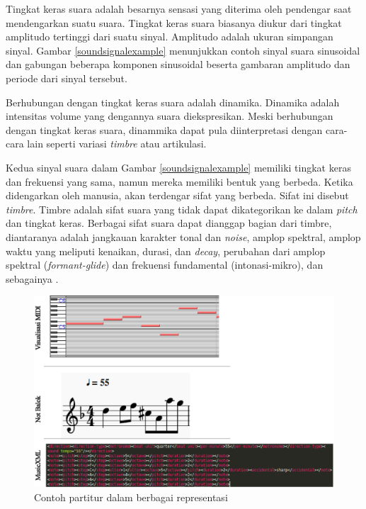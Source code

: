 Tingkat keras suara adalah besarnya sensasi yang diterima oleh pendengar saat mendengarkan suatu suara. Tingkat keras suara biasanya diukur dari tingkat amplitudo tertinggi dari suatu sinyal. \parencite{stevensloudness} Amplitudo adalah ukuran simpangan sinyal. \parencite{emilia2006tonaldesc} Gambar \ref{soundsignalexample} menunjukkan contoh sinyal suara sinusoidal dan gabungan beberapa komponen sinusoidal beserta gambaran amplitudo dan periode dari sinyal tersebut.

Berhubungan dengan tingkat keras suara adalah dinamika. Dinamika adalah intensitas volume yang dengannya suara diekspresikan. Meski berhubungan dengan tingkat keras suara, dinammika dapat pula diinterpretasi dengan cara-cara lain seperti variasi \textit{timbre} atau artikulasi. \parencite{Thiemel2001}

Kedua sinyal suara dalam Gambar \ref{soundsignalexample} memiliki tingkat keras dan frekuensi yang sama, namun mereka memiliki bentuk yang berbeda. Ketika didengarkan oleh manusia, akan terdengar sifat yang berbeda. Sifat ini disebut \textit{timbre}. Timbre adalah sifat suara yang tidak dapat dikategorikan ke dalam \textit{pitch} dan tingkat keras. Berbagai sifat suara dapat dianggap bagian dari timbre, diantaranya adalah jangkauan karakter tonal dan \textit{noise}, amplop spektral, amplop waktu yang meliputi kenaikan, durasi, dan \textit{decay}, perubahan dari amplop spektral (\textit{formant-glide}) dan frekuensi fundamental (intonasi-mikro), dan sebagainya \parencite{ericksonsoundstructure}. %

\begin{figure}[htbp]
    \centering
    \includegraphics[width=\textwidth]{resources/sheet-example.eps}
    \caption{Contoh partitur dalam berbagai representasi} \label{sheetexample}
\end{figure}


